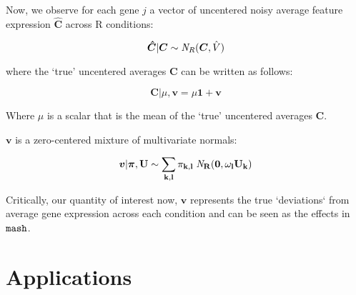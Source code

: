 \documentclass[11pt, oneside]{article}   	%
\newcommand{\ceff}{\bm{C}}
\newcommand{\chat}{\bm{\hat{C}}}
\newcommand{\vb}{\bm{v}}
\def\mash{{\tt mash}}
\begin{document}
Now, we observe for each gene $j$ a vector of uncentered noisy average feature expression $\chat$ across R conditions:

\begin{equation}
  \label{nobaselike}
\chat | \bm{\ceff} \sim {\it N}_R(\bm{\ceff}, \hat{V})
\end{equation}

where the `true' uncentered averages $\ceff$ can be written as follows:

\begin{equation}
  \label{uncenteredprior}
\ceff | \mu, \vb  = \mu \bm{1} + \vb
\end{equation}

Where $\mu$ is a scalar that is the mean of the `true' uncentered averages $\ceff$.

$\vb$ is a zero-centered mixture of multivariate normals:


 \begin{equation}
  \label{prior_v_mix}
  \vb | \bm{\pi},\bf{U} \sim \sum_{k,l} \pi_{k,l} \;{\it N}_R(\bm{0}, \omega_l U_{k})
\end{equation}

Critically, our quantity of interest now, $\vb$  represents the true `deviations` from average gene expression across each condition and can be seen as the effects in $\mash$.


\section{Applications}
\end{document}
